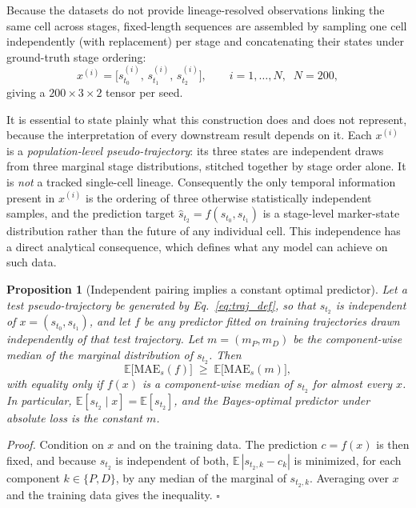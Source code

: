 \documentclass[pdflatex,sn-mathphys-num]{sn-jnl}
\theoremstyle{thmstyleone}%
\newtheorem{proposition}[theorem]{Proposition}%
\theoremstyle{thmstyletwo}%
\theoremstyle{thmstylethree}%
\begin{document}
Because the datasets do not provide lineage-resolved observations linking the same cell across stages, fixed-length sequences are assembled by sampling one cell independently (with replacement) per stage and concatenating their states under ground-truth stage ordering:
\begin{equation}
x^{(i)}=\big[s_{t_0}^{(i)},\,s_{t_1}^{(i)},\,s_{t_2}^{(i)}\big],
\qquad i=1,\dots,N,\;\; N=200,
\label{eq:traj_def}
\end{equation}
giving a $200\times 3\times 2$ tensor per seed.

It is essential to state plainly what this construction does and does not represent, because the interpretation of every downstream result depends on it. Each $x^{(i)}$ is a \emph{population-level pseudo-trajectory}: its three states are independent draws from three marginal stage distributions, stitched together by stage order alone. It is \emph{not} a tracked single-cell lineage. Consequently the only temporal information present in $x^{(i)}$ is the ordering of three otherwise statistically independent samples, and the prediction target $\hat{s}_{t_2}=f(s_{t_0},s_{t_1})$ is a stage-level marker-state distribution rather than the future of any individual cell. This independence has a direct analytical consequence, which defines what any model can achieve on such data.

\begin{proposition}[Independent pairing implies a constant optimal predictor]
\label{prop:null}
Let a test pseudo-trajectory be generated by Eq.~\eqref{eq:traj_def}, so that $s_{t_2}$ is independent of $x=(s_{t_0},s_{t_1})$, and let $f$ be any predictor fitted on training trajectories drawn independently of that test trajectory. Let $m=(m_P,m_D)$ be the component-wise median of the marginal distribution of $s_{t_2}$. Then
\[
\mathbb{E}\big[\mathrm{MAE}_s(f)\big]\;\ge\;\mathbb{E}\big[\mathrm{MAE}_s(m)\big],
\]
with equality only if $f(x)$ is a component-wise median of $s_{t_2}$ for almost every $x$. In particular, $\mathbb{E}[s_{t_2}\mid x]=\mathbb{E}[s_{t_2}]$, and the Bayes-optimal predictor under absolute loss is the constant $m$.
\end{proposition}

\noindent\emph{Proof.} Condition on $x$ and on the training data. The prediction $c=f(x)$ is then fixed, and because $s_{t_2}$ is independent of both, $\mathbb{E}\,|s_{t_2,k}-c_k|$ is minimized, for each component $k\in\{P,D\}$, by any median of the marginal of $s_{t_2,k}$. Averaging over $x$ and the training data gives the inequality. $\square$
\end{document}
